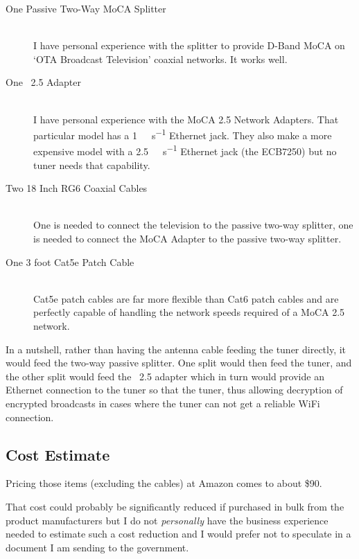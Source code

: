 \begin{description}
  \item[One Passive Two-Way MoCA Splitter] \hfill \\ I have personal experience with the
    splitter to provide D-Band MoCA on `OTA Broadcast Television' coaxial networks. It works
    well.
  \item[One \xdband{}~2.5 Adapter] \hfill \\ I have personal experience with the
    MoCA 2.5 Network Adapters. That particular model has a \SI{1}{\giga\bit\per\second} Ethernet jack.
    They also make a more expensive model with a \SI{2.5}{\giga\bit\per\second} Ethernet jack
    (the ECB7250) but no  tuner needs that capability.
  \item[Two 18 Inch RG6 Coaxial Cables] \hfill \\
    One is needed to connect the television to the passive two-way splitter, one is needed to
    connect the MoCA Adapter to the passive two-way splitter.
  \item[One 3 foot Cat5e Patch Cable] \hfill \\
    Cat5e patch cables are far more flexible than Cat6 patch cables and are perfectly capable of
    handling the network speeds required of a MoCA 2.5 network.
\end{description}

In a nutshell, rather than having the antenna cable feeding the  tuner directly, it would
feed the two-way passive splitter. One split would then feed the  tuner, and the other
split would feed the \xdband{}~2.5 adapter which in turn would provide an Ethernet connection
to the  tuner so that the tuner, thus allowing decryption of encrypted 
broadcasts in cases where the tuner can not get a reliable WiFi connection.

\subsection{Cost Estimate}

Pricing those items (excluding the cables) at Amazon comes to about \$90.

That cost could probably be significantly reduced if purchased in bulk from the product manufacturers
but I do not \emph{personally} have the business experience needed to estimate such a cost reduction
and I would prefer not to speculate in a document I am sending to the government.

